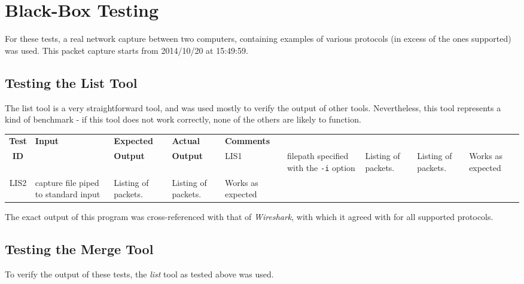 \documentclass[10pt,a4paper,notitlepage]{report}
\begin{document}
\section{Black-Box Testing}
For these tests, a real network capture between two computers, containing examples of various protocols (in excess of the ones supported) was used. This packet capture starts from 2014/10/20 at 15:49:59.

\subsection{Testing the List Tool}
The list tool is a very straightforward tool, and was used mostly to verify the output of other tools. Nevertheless, this tool represents a kind of benchmark - if this tool does not work correctly, none of the others are likely to function.

\begin{tabularx}{\textwidth}{|c|X|X|X|X|}
\hline
\textbf{Test} & \textbf{Input} & \textbf{Expected} & \textbf{Actual} & \textbf{Comments}\\
\textbf{ID} & & \textbf{Output} & \textbf{Output} &
\endhead
\hline
LIS1 & filepath specified with the \texttt{-i} option & Listing of packets. & Listing of packets. & Works as expected \\ \hline
LIS2 & capture file piped to standard input & Listing of packets. & Listing of packets. & Works as expected \\ \hline
\end{tabularx}

The exact output of this program was cross-referenced with that of \emph{Wireshark}, with which it agreed with for all supported protocols.

\subsection{Testing the Merge Tool}

To verify the output of these tests, the \emph{list} tool as tested above was used.
\end{document}
